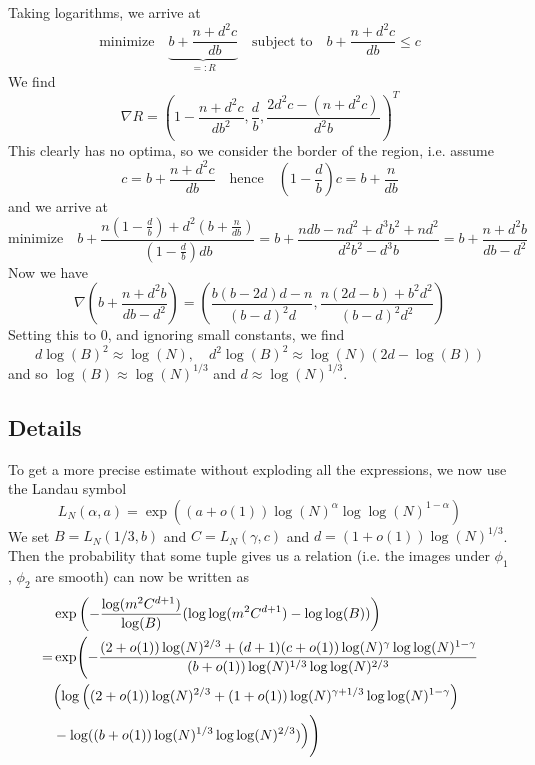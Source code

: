 \documentclass{scrartcl}
\theoremstyle{definition}
\begin{document}
Taking logarithms, we arrive at
\begin{equation*}
    \text{minimize} \quad \underbrace{b + \frac {n + d^2 c} {db}}_{=: R} \quad \text{subject to} \quad b + \frac {n + d^2 c} {db} \leq c
\end{equation*}
We find
\begin{equation*}
    \nabla R = \left(1 - \frac {n + d^2c} {db^2}, \frac d b, \frac {2d^2c - (n + d^2c)} {d^2b} \right)^T
\end{equation*}
This clearly has no optima, so we consider the border of the region, i.e. assume
\begin{equation*}
    c = b + \frac {n + d^2 c} {db} \quad \text{hence} \quad \left(1 - \frac d b\right) c = b + \frac n {db}
\end{equation*}
and we arrive at
\begin{equation*}
    \text{minimize}\quad b + \frac {n(1 - \frac d b) + d^2(b + \frac n {db})} {(1 - \frac d b)db} = b + \frac {ndb - nd^2 + d^3b^2 + nd^2} {d^2b^2 - d^3b} = b + \frac {n + d^2b} {db - d^2}
\end{equation*}
Now we have
\begin{equation*}
    \nabla \left( b + \frac {n + d^2 b} {db - d^2} \right) = \left( \frac {b(b - 2d)d - n} {(b - d)^2d}, \frac {n(2d - b) + b^2d^2} {(b - d)^2d^2} \right)
\end{equation*}
Setting this to 0, and ignoring small constants, we find
\begin{equation*}
    d\log(B)^2 \approx \log(N), \quad d^2\log(B)^2 \approx \log(N)(2d - \log(B))
\end{equation*}
and so $\log(B) \approx \log(N)^{1/3}$ and $d \approx \log(N)^{1/3}$.

\subsection{Details}
To get a more precise estimate without exploding all the expressions, we now use the Landau symbol
\begin{equation*}
    L_N(\alpha, a) = \exp((a + o(1))\log(N)^\alpha\log\log(N)^{1 - \alpha})
\end{equation*}
We set $B = L_N(1/3, b)$ and $C = L_N(\gamma, c)$ and $d = (1 + o(1))\log(N)^{1/3}$.
Then the probability that some tuple gives us a relation (i.e. the images under $\phi_1$, $\phi_2$ are smooth) can now be written as
\begin{align*}
    & \exp\left( - \frac {\log(m^2C^{d + 1})} {\log(B)} (\log\log(m^2C^{d + 1}) - \log\log(B)) \right) \\
    =& \exp\Biggl( -\frac {(2 + o(1))\log(N)^{2/3} + (d + 1)(c + o(1))\log(N)^\gamma\log\log(N)^{1 - \gamma}} {(b + o(1))\log(N)^{1/3}\log\log(N)^{2/3}} \\
    &\Bigl( \log\left((2 + o(1))\log(N)^{2/3} + (1 + o(1))\log(N)^{\gamma + 1/3}\log\log(N)^{1 - \gamma} \right) \\
    &- \log((b + o(1))\log(N)^{1/3}\log\log(N)^{2/3}) \Bigr) \Biggr)
\end{align*}

\printbibliography
\end{document}
